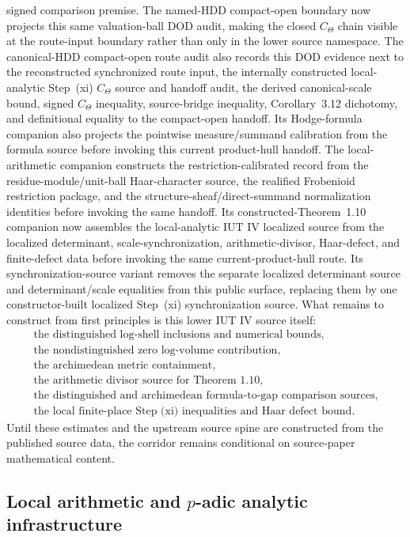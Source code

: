 \documentclass[11pt]{article}
\newcommand{\IUT}{IUT}
\theoremstyle{plain}
\theoremstyle{definition}
\theoremstyle{remark}
\begin{document}
signed comparison premise.  The named-HDD compact-open boundary now projects
this same valuation-ball DOD audit, making the closed \(C_\Theta\) chain
visible at the route-input boundary rather than only in the lower source
namespace.  The canonical-HDD compact-open route audit also records this DOD
evidence next to the reconstructed synchronized route input, the internally
constructed local-analytic Step~(xi) \(C_\Theta\) source and handoff audit,
the derived canonical-scale bound, signed \(C_\Theta\) inequality,
source-bridge inequality, Corollary~3.12 dichotomy, and definitional equality
to the compact-open handoff.  Its Hodge-formula companion also projects
the pointwise measure/summand calibration from the formula source before
invoking this current product-hull handoff.  The local-arithmetic companion
constructs the restriction-calibrated record from the residue-module/unit-ball
Haar-character source, the realified Frobenioid restriction package, and the
structure-sheaf/direct-summand normalization identities before invoking the
same handoff.  Its constructed-Theorem~1.10 companion now assembles the
local-analytic \IUT{} IV localized source from the localized determinant,
scale-synchronization, arithmetic-divisor, Haar-defect, and finite-defect data
before invoking the same current-product-hull route.  Its synchronization-source
variant removes the separate localized determinant source and determinant/scale
equalities from this public surface, replacing them by one constructor-built
localized Step~(xi) synchronization source.  What remains to construct from first
principles is this lower IUT IV source itself:
\[
\begin{array}{l}
\text{the distinguished log-shell inclusions and numerical bounds},\\
\text{the nondistinguished zero log-volume contribution},\\
\text{the archimedean metric containment},\\
\text{the arithmetic divisor source for Theorem 1.10},\\
\text{the distinguished and archimedean formula-to-gap comparison sources},\\
\text{the local finite-place Step (xi) inequalities and Haar defect bound}.
\end{array}
\]
Until these estimates and the upstream source spine are constructed from the
published source data, the corridor remains conditional on source-paper
mathematical content.

\subsection{\texorpdfstring{Local arithmetic and \(p\)-adic analytic infrastructure}{Local arithmetic and p-adic analytic infrastructure}}
\end{document}
